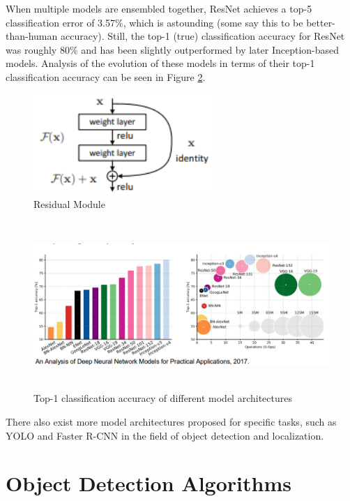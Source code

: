 \documentclass[twoside]{article}
\begin{document}
\begin{itemize}
When multiple models are ensembled together, ResNet achieves a top-5 classification error of 3.57\%, which is astounding (some say this to be better-than-human accuracy). Still, the top-1 (true) classification accuracy for ResNet was roughly 80\% and has been slightly outperformed by later Inception-based models. Analysis of the evolution of these models in terms of their top-1 classification accuracy can be seen in Figure \ref{fig:top1e}.

\begin{figure}[!htb]
\centering
\includegraphics[height=1.5in]{pics/residual.PNG}
\caption{Residual Module\cite{resnet}}
\label{fig:residual}
\end{figure}

\begin{figure}[!htb]
\centering
\includegraphics[height=2.5in]{pics/top1error.png}
\caption{Top-1 classification accuracy of different model architectures}
\label{fig:top1e}
\end{figure}
\end{itemize}

There also exist more model architectures proposed for specific tasks, such as YOLO\cite{yolo} and Faster R-CNN\cite{faster_rcnn} in the field of object detection and localization.

\section{Object Detection Algorithms}
\end{document}
